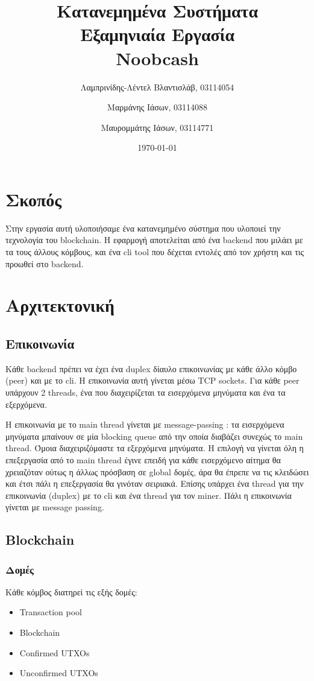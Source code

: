 \documentclass[a4paper,oneside, 12pt]{article}
\title{
	\textbf{Κατανεμημένα Συστήματα}\\
	\textbf{Εξαμηνιαία Εργασία}\\
	Noobcash
 }
\author{
	Λαμπρινίδης-Λέντελ Βλαντισλάβ, 03114054
	\and
	Μαρμάνης Ιάσων, 03114088
	\and
	Μαυρομμάτης Ιάσων, 03114771
}
\date{\today}
\begin{document}
	
\maketitle

\section{Σκοπός}
Στην εργασία αυτή υλοποιήσαμε ένα κατανεμημένο σύστημα που υλοποιεί την τεχνολογία του 
blockchain.
Η εφαρμογή αποτελείται από ένα backend που μιλάει με τα τους άλλους κόμβους, και ένα cli tool που δέχεται εντολές από τον χρήστη και τις προωθεί στο backend.

\section{Αρχιτεκτονική}
\subsection{Επικοινωνία}
Κάθε backend πρέπει να έχει ένα duplex δίαυλο επικοινωνίας με κάθε άλλο κόμβο (peer) και με το cli.
Η επικοινωνία αυτή γίνεται μέσω TCP sockets. Για κάθε peer υπάρχουν 2 threads, ένα που διαχειρίζεται τα εισερχόμενα μηνύματα και ένα τα εξερχόμενα. 

Η επικοινωνία με το main thread γίνεται με message-passing : τα εισερχόμενα μηνύματα μπαίνουν σε μία blocking queue από την οποία διαβάζει συνεχώς το main thread. Όμοια διαχειριζόμαστε τα εξερχόμενα μηνύματα. Η επιλογή να γίνεται όλη η επεξεργασία από το main thread έγινε επειδή για κάθε εισερχόμενο αίτημα θα χρειαζόταν ούτως η άλλως πρόσβαση σε global δομές, άρα θα έπρεπε να τις κλειδώσει και έτσι πάλι η επεξεργασία θα γινόταν σειριακά. Επίσης υπάρχει ένα thread για την επικοινωνία (duplex) με το cli και ένα thread για τον miner. Πάλι η επικοινωνία γίνεται με message passing.

\subsection{Blockchain}
\subsubsection{Δομές}
Κάθε κόμβος διατηρεί τις εξής δομές:

\begin{itemize}
	\item Transaction pool
	\item Blockchain
	\item Confirmed UTXOs
	\item Unconfirmed UTXOs
\end{itemize}
\end{document}
